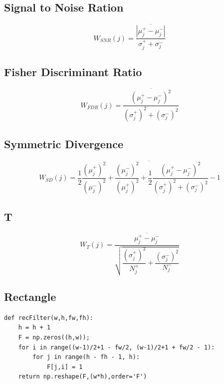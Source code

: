 \documentclass[12pt, letterpaper]{article}
\begin{document}
\subsection{Signal to Noise Ration}

\begin{equation} \label{SNR}
W_{SNR}(j) = \overline{\dfrac{| \mu^{+}_{j} - \mu^{-}_{j} |}{\sigma^{+}_{j} + \sigma^{-}_{j}}}
\end{equation}

\subsection{Fisher Discriminant Ratio}

\begin{equation} \label{FDR}
W_{FDR}(j) = \overline{\dfrac{( \mu^{+}_{j} - \mu^{-}_{j} )^{2}}{(\sigma^{+}_{j})^{2} + (\sigma^{-}_{j})^{2}}}
\end{equation}

\subsection{Symmetric Divergence}

\begin{equation} \label{SD}
W_{SD}(j) = \overline{\dfrac{1}{2} \dfrac{(\mu^{+}_{j})^{2}}{(\mu^{-}_{j})^{2}} + \dfrac{(\mu^{-}_{j})^{2}}{(\mu^{+}_{j})^{2}} + \dfrac{1}{2} \dfrac{( \mu^{+}_{j} - \mu^{-}_{j} )^{2}}{(\sigma^{+}_{j})^{2} + (\sigma^{-}_{j})^{2}} - 1}
\end{equation}

\subsection{T}

\begin{equation} \label{T}
W_{T}(j) = \overline{\dfrac{ \mu^{+}_{j} - \mu^{-}_{j}}{\sqrt{\dfrac{(\sigma^{+}_{j})^{2}}{N^{+}_{j}} + \dfrac{(\sigma^{-}_{j})^{2}}{N^{-}_{j}}}}}
\end{equation}

\subsection{Rectangle}

\begin{verbatim}
def recFilter(w,h,fw,fh):
    h = h + 1
    F = np.zeros((h,w));
    for i in range((w-1)/2+1 - fw/2, (w-1)/2+1 + fw/2 - 1):
        for j in range(h - fh - 1, h):
            F[j,i] = 1
    return np.reshape(F,(w*h),order='F')
\end{verbatim}
\end{document}
